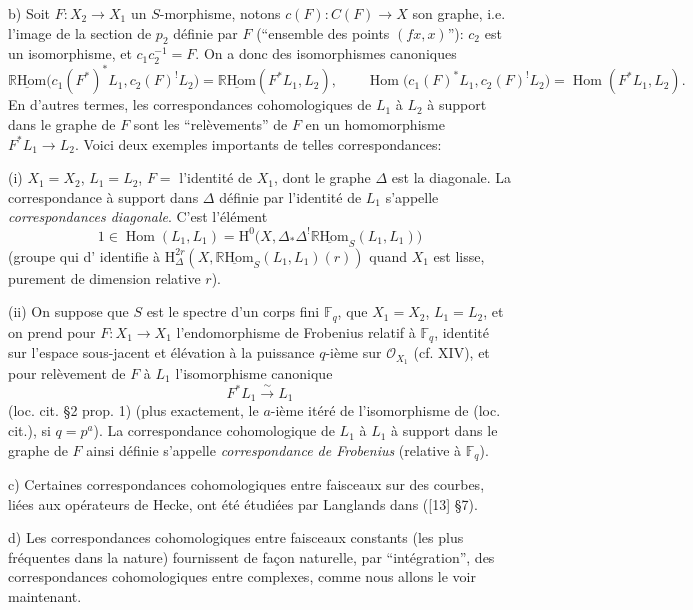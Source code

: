 \documentclass[11pt]{article}
\renewcommand{\H}{\mathrm{H}}
\DeclareMathOperator{\Hom}{Hom}
\newcommand{\R}{\mathbb{R}}\newcommand{\RHomCore}{\mathbb{R}\mathrm{Hom}}
\providecommand{\RHom}{\RHomCore}
\providecommand{\uRHom}{\underline{\RHom}}
\providecommand{\RHom}{\RHomCore}
\providecommand{\Hom}{\operatorname{Hom}}
\providecommand{\RHom}{\R\mathcal{H}om}
\providecommand{\R}{\mathrm R}
\providecommand{\RHom}{\RHomCore}
\providecommand{\Hom}{\operatorname{Hom}}
\begin{document}
b) Soit $F:X_2\to X_1$ un $S$-morphisme, notons $c(F):C(F)\to X$ son graphe, i.e. l'image de la section de $p_2$ définie par $F$ (``ensemble des points $(fx,x)$''): $c_2$ est un isomorphisme, et $c_1c_2^{-1}=F$. On a donc des isomorphismes canoniques
\begin{equation}
\uRHom\bigl(c_1(F^*)^*L_1,c_2(F)^!L_2\bigr)=\uRHom(F^*L_1,L_2),
\qquad
\Hom\bigl(c_1(F)^*L_1,c_2(F)^!L_2\bigr)=\Hom(F^*L_1,L_2).
\tag{3.2.6}
\end{equation}
En d'autres termes, les correspondances cohomologiques de $L_1$ à $L_2$ à support dans le graphe de $F$ sont les ``relèvements'' de $F$ en un homomorphisme $F^*L_1\to L_2$. Voici deux exemples importants de telles correspondances:

(i) $X_1=X_2$, $L_1=L_2$, $F=$ l'identité de $X_1$, dont le graphe $\Delta$ est la diagonale. La correspondance à support dans $\Delta$ définie par l'identité de $L_1$ s'appelle \emph{correspondances diagonale}. C'est l'élément
\[
1\in \Hom(L_1,L_1)=\H^0\bigl(X,\Delta_*\Delta^!\uRHom_S(L_1,L_1)\bigr)
\]
(groupe qui d'%
identifie à 
$\H^{2r}_\Delta(X,\uRHom_S(L_1,L_1)(r))$ quand $X_1$ est lisse, purement de dimension relative $r$).

(ii) On suppose que $S$ est le spectre d'un corps fini $\mathbb F_q$, que $X_1=X_2$, $L_1=L_2$, et on prend pour $F:X_1\to X_1$ l'endomorphisme de Frobenius relatif à $\mathbb F_q$, identité sur l'espace sous-jacent et élévation à la puissance $q$-ième sur $\mathcal O_{X_1}$ (cf. XIV), et pour relèvement de $F$ à $L_1$ l'isomorphisme canonique
\[
F^*L_1\xrightarrow{\sim}L_1
\]
(loc. cit. §2 prop. 1) (plus exactement, le $a$-ième itéré de l'isomorphisme de (loc. cit.), si $q=p^a$). La correspondance cohomologique de $L_1$ à $L_1$ à support dans le graphe de $F$ ainsi définie s'appelle \emph{correspondance de Frobenius} (relative à $\mathbb F_q$).

c) Certaines correspondances cohomologiques entre faisceaux sur des courbes, liées aux opérateurs de Hecke, ont été étudiées par Langlands dans ([13] §7).

d) Les correspondances cohomologiques entre faisceaux constants (les plus fréquentes dans la nature) fournissent de façon naturelle, par ``intégration'', des correspondances cohomologiques entre complexes, comme nous allons le voir maintenant.
\end{document}
